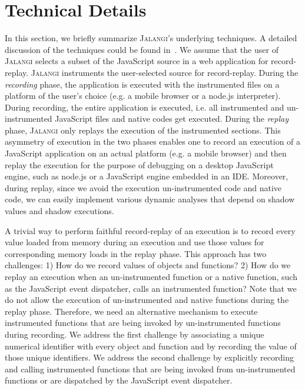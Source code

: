 \documentclass{sig-alternate}
\def\jalangi{\textsc{Jalangi}}
\begin{document}
\section{Technical Details}
\label{sec:technical-details}

In this section, we briefly summarize \jalangi{}'s underlying
techniques.  A detailed discussion of the techniques could be found
in~\cite{SBGKfse13}.  We assume that the user of \jalangi{} selects a
subset of the JavaScript source in a web application for
record-replay.  \jalangi{} instruments the user-selected source for
record-replay.  During the \emph{recording} phase, the application is
executed with the instrumented files on a platform of the user's
choice (e.g. a mobile browser or a node.js interpreter).  During
recording, the entire application is executed, i.e. all instrumented
and un-instrumented JavaScript files and native codes get executed.
During the \emph{replay} phase, \jalangi{} only replays the execution
of the instrumented sections.  This asymmetry of execution in the two
phases enables one to record an execution of a JavaScript application
on an actual platform (e.g. a mobile browser) and then replay the
execution for the purpose of debugging on a desktop JavaScript engine,
such as node.js or a JavaScript engine embedded in an IDE.  Moreover,
during replay, since we avoid the execution un-instrumented code and
native code, we can easily implement various dynamic analyses that
depend on shadow values and shadow executions.

A trivial way to perform faithful record-replay of an execution is to
record every value loaded from memory during an execution and use
those values for corresponding memory loads in the replay phase.  This
approach has two challenges: 1) How do we record values of objects and
functions?  2) How do we replay an execution when an un-instrumented
function or a native function, such as the JavaScript event
dispatcher, calls an instrumented function?  Note that we do not allow
the execution of un-instrumented and native functions during the
replay phase.  Therefore, we need an alternative mechanism to execute
instrumented functions that are being invoked by un-instrumented
functions during recording.  We address the first challenge by
associating a unique numerical identifier with every object and
function and by recording the value of those unique identifiers.  We
address the second challenge by explicitly recording and calling
instrumented functions that are being invoked from un-instrumented
functions or are dispatched by the JavaScript event dispatcher.
\end{document}

